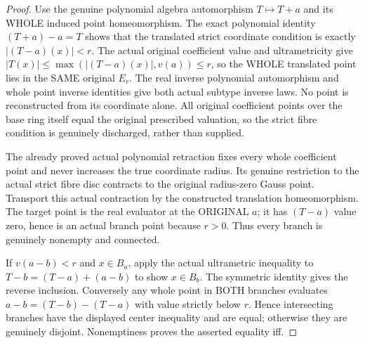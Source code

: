 \begin{proof}
Use the genuine polynomial algebra automorphism $T\mapsto T+a$ and its
WHOLE induced point homeomorphism. The exact polynomial identity
$(T+a)-a=T$ shows that the translated strict coordinate condition is exactly
$|(T-a)(x)|<r$. The actual original coefficient value and ultrametricity give
$|T(x)|\le\max(|(T-a)(x)|,v(a))\le r$, so the WHOLE translated point lies
in the SAME original $E_r$. The real inverse polynomial automorphism and
whole point inverse identities give both actual subtype inverse laws. No
point is reconstructed from its coordinate alone. All original coefficient
points over the base ring itself equal the original prescribed valuation,
so the strict fibre condition is genuinely discharged, rather than supplied.

The already proved actual polynomial retraction fixes every whole coefficient
point and never increases the true coordinate radius. Its genuine restriction
to the actual strict fibre disc contracts to the original radius-zero Gauss
point. Transport this actual contraction by the constructed translation
homeomorphism. The target point is the real evaluator at the ORIGINAL $a$;
it has $(T-a)$ value zero, hence is an actual branch point because $r>0$.
Thus every branch is genuinely nonempty and connected.

If $v(a-b)<r$ and $x\in B_a$, apply the actual ultrametric inequality to
$T-b=(T-a)+(a-b)$ to show $x\in B_b$. The symmetric identity gives the
reverse inclusion. Conversely any whole point in BOTH branches evaluates
$a-b=(T-b)-(T-a)$ with value strictly below $r$. Hence intersecting branches
have the displayed center inequality and are equal; otherwise they are
genuinely disjoint. Nonemptiness proves the asserted equality iff.
\end{proof}

